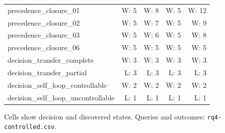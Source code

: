 \begin{longtable}{@{}lrrrr@{}}
precedence\_closure\_01 & W: 5 & W: 8 & W: 5 & W: 12\\
precedence\_closure\_02 & W: 5 & W: 7 & W: 5 & W: 9\\
precedence\_closure\_03 & W: 5 & W: 6 & W: 5 & W: 8\\
precedence\_closure\_06 & W: 5 & W: 5 & W: 5 & W: 5\\
decision\_transfer\_complete & W: 3 & W: 3 & W: 3 & W: 3\\
decision\_transfer\_partial & L: 3 & L: 3 & L: 3 & L: 3\\
decision\_self\_loop\_controllable & W: 2 & W: 2 & W: 2 & W: 2\\
decision\_self\_loop\_uncontrollable & L: 1 & L: 1 & L: 1 & L: 1\\
\bottomrule\end{longtable}
Cells show decision and discovered states. Queries and outcomes: \texttt{rq4-controlled.csv}.
